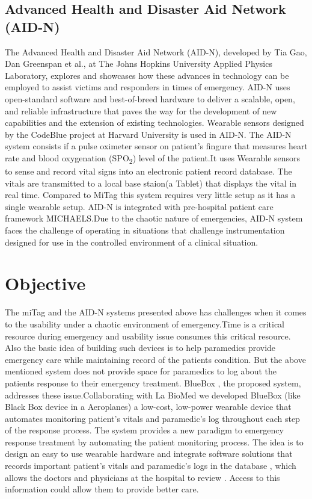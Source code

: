 \subsection{Advanced Health
	and Disaster Aid Network (AID-N)}
\hspace{10mm}The Advanced Health and Disaster Aid Network (AID-N), developed by Tia Gao, Dan Greenspan et al., \cite{AID-N} at The Johns Hopkins University Applied Physics Laboratory, explores and showcases how these advances in technology can be employed to assist victims and responders in times of emergency. AID-N uses open-standard software and best-of-breed hardware to deliver a scalable, open, and reliable infrastructure that paves the way for the development of new capabilities and the extension of existing technologies. 
Wearable sensors designed by the CodeBlue project at Harvard University is used in AID-N. The AID-N system consists if a pulse oximeter sensor on patient's fingure that measures heart rate and blood oxygenation (SPO\textsubscript{2}) level of the patient.It uses Wearable sensors to sense and record vital signs into an electronic patient record database. The vitals are transmitted to a local base staion(a Tablet) that displays the vital in real time. Compared to MiTag this system requires very little setup as it has a single wearable setup. AID-N is integrated with pre-hospital patient care framework MICHAELS.Due to the chaotic nature of emergencies, AID-N system
faces the challenge of operating in situations that challenge instrumentation designed for use in
the controlled environment of a clinical situation. 


\section{Objective}
\hspace{10mm}The miTag and the AID-N systems presented above has challenges when it comes to the usability under a chaotic environment of emergency.Time is a critical resource during emergency and usability issue consumes this critical resource. Also the basic idea of building such devices is to help paramedics provide emergency care while maintaining record of the patients condition. But the above mentioned system does not provide space for paramedics to log about the patients response to their emergency treatment. BlueBox , the proposed system, addresses these issue.Collaborating with La BioMed we developed BlueBox (like Black Box device in a Aeroplanes) a low-cost, low-power wearable device that automates monitoring patient’s vitals and paramedic's log throughout each step of the response process.  The system provides a new paradigm to emergency response treatment by automating the patient monitoring process. The idea is to design an easy to use wearable hardware and integrate software solutions that records important  patient’s vitals and paramedic's logs in the database , which allows the doctors and physicians at the hospital to review . Access to this information could allow them to provide better care.


